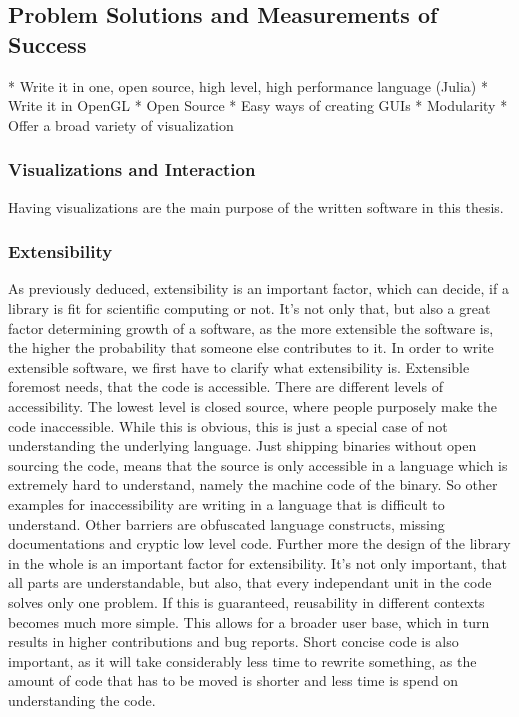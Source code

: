 \subsection{Problem Solutions and Measurements of Success}
* Write it in one, open source, high level, high performance language (Julia)
* Write it in OpenGL
* Open Source
* Easy ways of creating GUIs
* Modularity
* Offer a broad variety of visualization

\subsubsection{Visualizations and Interaction}

Having visualizations are the main purpose of the written software in this thesis.





\subsubsection{Extensibility}
As previously deduced, extensibility is an important factor, which can decide, if a library is fit for scientific computing or not. 
It's not only that, but also a great factor determining growth of a software, as the more extensible the software is, the higher the probability that someone else contributes to it.
In order to write extensible software, we first have to clarify what extensibility is.
Extensible foremost needs, that the code is accessible. There are different levels of accessibility. The lowest level is closed source, where people purposely make the code inaccessible. While this is obvious, this is just a special case of not understanding the underlying language. Just shipping binaries without open sourcing the code, means that the source is only accessible in a language which is extremely hard to understand, namely the machine code of the binary. So other examples for inaccessibility are writing in a language that is difficult to understand. Other barriers are obfuscated language constructs, missing documentations and cryptic low level code.
Further more the design of the library in the whole is an important factor for extensibility. It's not only important, that all parts are understandable, but also, that every independant unit in the code solves only one problem. 
If this is guaranteed, reusability in different contexts becomes much more simple. This allows for a broader user base, which in turn results in higher contributions and bug reports. 
Short concise code is also important, as it will take considerably less time to rewrite something, as the amount of code that has to be moved is shorter and less time is spend on understanding the code.

